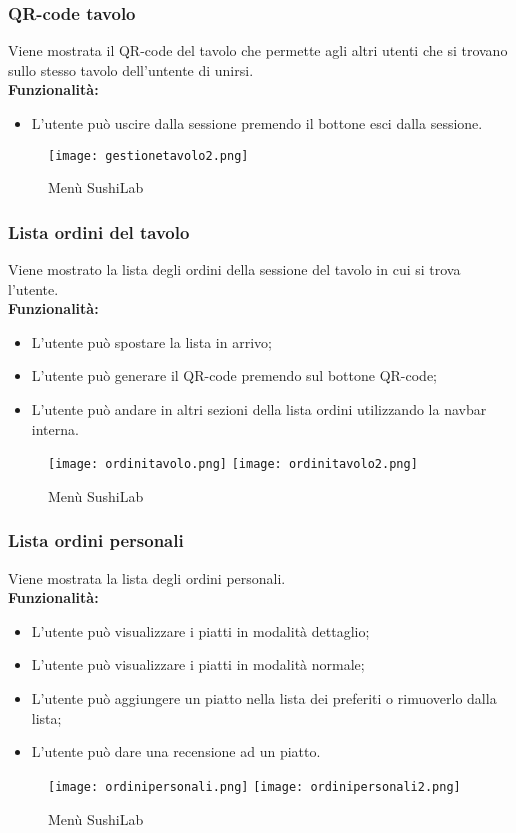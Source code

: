 \subsubsection{QR-code tavolo}
Viene mostrata il QR-code del tavolo che permette agli altri utenti che si trovano sullo stesso tavolo dell'untente di unirsi.\\
\textbf{Funzionalità:}
\begin{itemize}
    \item L'utente può uscire dalla sessione premendo il bottone esci dalla sessione.
\end{itemize}
\begin{figure}[H]
    \centering
    \texttt{[image: gestionetavolo2.png]}
    \caption{Menù SushiLab}
\end{figure}
\subsubsection{Lista ordini del tavolo}
Viene mostrato la lista degli ordini della sessione del tavolo in cui si trova l'utente.\\
\textbf{Funzionalità:}
\begin{itemize}
    \item L'utente può spostare la lista in arrivo;
    \item L'utente può generare il QR-code premendo sul bottone QR-code;
    \item L'utente può andare in altri sezioni della lista ordini utilizzando la navbar interna.
\end{itemize}
\begin{figure}[H]
    \centering
    \texttt{[image: ordinitavolo.png]}
    \texttt{[image: ordinitavolo2.png]}
    \caption{Menù SushiLab}
\end{figure}
\subsubsection{Lista ordini personali}
Viene mostrata la lista degli ordini personali.\\
\textbf{Funzionalità:}
\begin{itemize}
    \item L'utente può visualizzare i piatti in modalità dettaglio;
    \item L'utente può visualizzare i piatti in modalità normale;
    \item L'utente può aggiungere un piatto nella lista dei preferiti o rimuoverlo dalla lista;
    \item L'utente può dare una recensione ad un piatto.
\end{itemize}
\begin{figure}[H]
    \centering
    \texttt{[image: ordinipersonali.png]}
    \texttt{[image: ordinipersonali2.png]}
    \caption{Menù SushiLab}
\end{figure}
